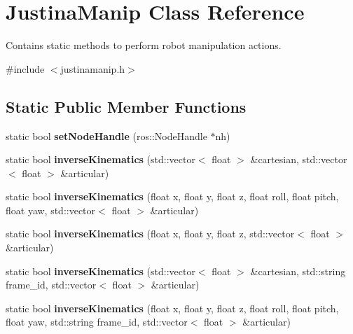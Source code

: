 \hypertarget{class_justina_manip}{}\section{Justina\+Manip Class Reference}
\label{class_justina_manip}


Contains static methods to perform robot manipulation actions.  




{\ttfamily \#include $<$justinamanip.\+h$>$}

\subsection*{Static Public Member Functions}
\begin{DoxyCompactItemize}
\item 
static bool {\bfseries set\+Node\+Handle} (ros\+::\+Node\+Handle $\ast$nh)\hypertarget{class_justina_manip_a9f5c9c30d83cac72d72fa3fbf2d4e9b5}{}\label{class_justina_manip_a9f5c9c30d83cac72d72fa3fbf2d4e9b5}

\item 
static bool {\bfseries inverse\+Kinematics} (std\+::vector$<$ float $>$ \&cartesian, std\+::vector$<$ float $>$ \&articular)\hypertarget{class_justina_manip_ae192c6e0a12481358748743be88e4dd9}{}\label{class_justina_manip_ae192c6e0a12481358748743be88e4dd9}

\item 
static bool {\bfseries inverse\+Kinematics} (float x, float y, float z, float roll, float pitch, float yaw, std\+::vector$<$ float $>$ \&articular)\hypertarget{class_justina_manip_a50976764f4c29040d38f1e8fb3c8d4d3}{}\label{class_justina_manip_a50976764f4c29040d38f1e8fb3c8d4d3}

\item 
static bool {\bfseries inverse\+Kinematics} (float x, float y, float z, std\+::vector$<$ float $>$ \&articular)\hypertarget{class_justina_manip_a1c567dc4a4f6fff72e1bf0c2aa4338af}{}\label{class_justina_manip_a1c567dc4a4f6fff72e1bf0c2aa4338af}

\item 
static bool {\bfseries inverse\+Kinematics} (std\+::vector$<$ float $>$ \&cartesian, std\+::string frame\+\_\+id, std\+::vector$<$ float $>$ \&articular)\hypertarget{class_justina_manip_aed9c0cbc390829641900d4d182218d7d}{}\label{class_justina_manip_aed9c0cbc390829641900d4d182218d7d}

\item 
static bool {\bfseries inverse\+Kinematics} (float x, float y, float z, float roll, float pitch, float yaw, std\+::string frame\+\_\+id, std\+::vector$<$ float $>$ \&articular)\hypertarget{class_justina_manip_aab2ca816e6fc006aaec629abba33b218}{}\label{class_justina_manip_aab2ca816e6fc006aaec629abba33b218}


\end{DoxyCompactItemize}
